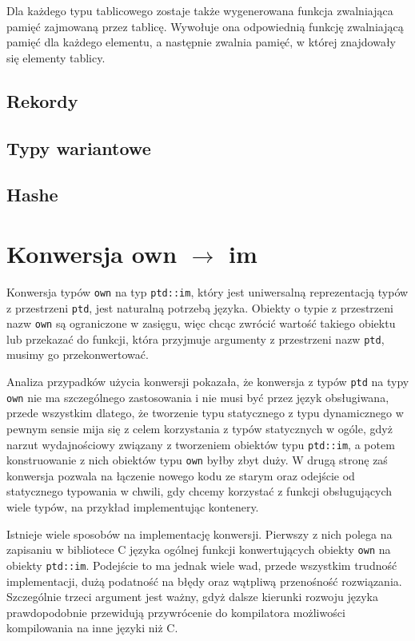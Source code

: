 \documentclass[licencjacka]{pracamgr}
\begin{document}
Dla każdego typu tablicowego zostaje także wygenerowana funkcja zwalniająca pamięć zajmowaną
przez tablicę. Wywołuje ona odpowiednią funkcję zwalniającą pamięć dla każdego elementu,
a następnie zwalnia pamięć, w której znajdowały się elementy tablicy.
\subsection{Rekordy}
\subsection{Typy wariantowe}
\subsection{Hashe}
\section{Konwersja own $\rightarrow$ im}
\label{sec:own_to_im}
Konwersja typów \texttt{own} na typ \texttt{ptd::im}, który jest uniwersalną reprezentacją typów z przestrzeni \texttt{ptd},
jest naturalną potrzebą języka. Obiekty o typie z przestrzeni nazw \texttt{own} są ograniczone w zasięgu,
więc chcąc zwrócić wartość takiego obiektu lub przekazać do funkcji, która przyjmuje argumenty z przestrzeni
nazw \texttt{ptd}, musimy go przekonwertować.

Analiza przypadków użycia konwersji pokazała, że konwersja z typów \texttt{ptd} na typy \texttt{own} nie ma 
szczególnego zastosowania i nie musi być przez język obsługiwana, przede wszystkim dlatego,
że tworzenie typu statycznego z typu dynamicznego w pewnym sensie mija się z celem korzystania z typów statycznych w ogóle,
gdyż narzut wydajnościowy związany z tworzeniem obiektów typu \texttt{ptd::im}, a potem konstruowanie z nich obiektów typu \texttt{own} byłby zbyt duży.
W drugą stronę zaś konwersja pozwala na łączenie nowego kodu ze starym oraz odejście od statycznego typowania w chwili,
gdy chcemy korzystać z funkcji obsługujących wiele typów, na przykład implementując kontenery.

Istnieje wiele sposobów na implementację konwersji. Pierwszy z nich polega na zapisaniu w bibliotece C języka ogólnej funkcji konwertujących obiekty \texttt{own} na obiekty \texttt{ptd::im}.
Podejście to ma jednak wiele wad, przede wszystkim trudność implementacji, dużą podatność na błędy oraz wątpliwą przenośność rozwiązania.
Szczególnie trzeci argument jest ważny, gdyż dalsze kierunki rozwoju języka prawdopodobnie przewidują przywrócenie do kompilatora możliwości kompilowania na inne języki niż C.
\end{document}
